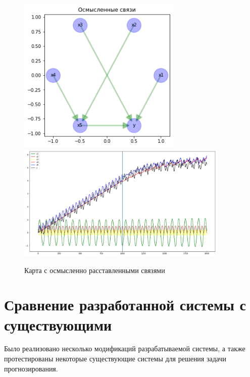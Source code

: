 \begin{figure}
	\centering
	\includegraphics[width=0.7\textwidth]{./img/lstmfcm_meaningful.png}
	\includegraphics[width=0.9\textwidth]{./img/lstmfcm_meaningful_prediction.png}
	\caption{Карта с осмысленно расставленными связями}
	\label{pic:lstmfcm_meaningful}
\end{figure}



\section{Сравнение разработанной системы с существующими}

Было реализовано несколько модификаций разрабатываемой системы, а также
протестированы некоторые существующие системы для решения задачи прогнозирования.



